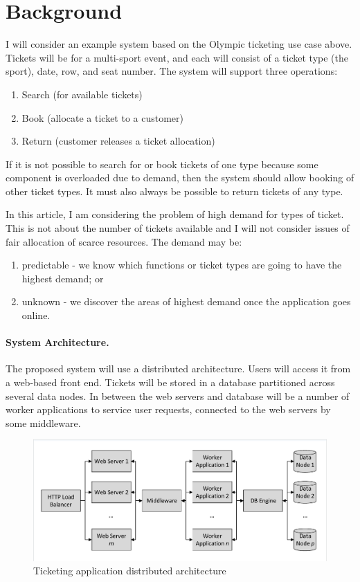 \documentclass{llncs}
\begin{document}
%
%

\section{Background}

I will consider an example system based on the Olympic ticketing use case above.  Tickets will be for a multi-sport event, and each will consist of a ticket type (the sport), date, row, and seat number.  The system will support three operations:
\begin{enumerate}
\item Search (for available tickets)
\item Book (allocate a ticket to a customer)
\item Return (customer releases a ticket allocation)
\end{enumerate}

If it is not possible to search for or book tickets of one type because some component is overloaded due to demand, then the system should allow booking of other ticket types.  It must also always be possible to return tickets of any type.

In this article, I am considering the problem of high demand for types of ticket.  This is not about the number of tickets available and I will not consider issues of fair allocation of scarce resources.  The demand may be:
\begin{enumerate}
\item predictable - we know which functions or ticket types are going to have the highest demand; or
\item unknown - we discover the areas of highest demand once the application goes online.
\end{enumerate}

\paragraph{System Architecture.}

The proposed system will use a distributed architecture.  Users will access it from a web-based front end.  Tickets will be stored in a database partitioned across several data nodes.  In between the web servers and database will be a number of worker applications to service user requests, connected to the web servers by some middleware.

\begin{figure}
\caption{Ticketing application distributed architecture}
\centering
\includegraphics[trim = 5 5 5 5, clip, width=\textwidth]{img/application}
\end{figure}
\end{document}
